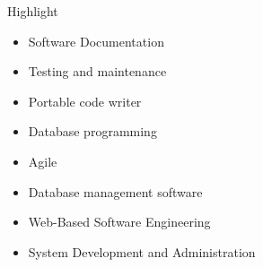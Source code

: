 \documentclass{resume} %
\begin{document}
\begin{rSection}{Highlight}
        \begin{multicols}{2}
        \begin{itemize}[noitemsep,topsep=-6pt]
            \item Software Documentation
            \item Testing and maintenance
            \item Portable code writer
            \item Database programming
        \end{itemize}
        \columnbreak
        \begin{itemize}[noitemsep,topsep=-6pt]
            \item Agile
            \item Database management software
            \item Web-Based Software Engineering
            \item System Development and Administration
        \end{itemize}
        \end{multicols}
\end{rSection}
\end{document}
